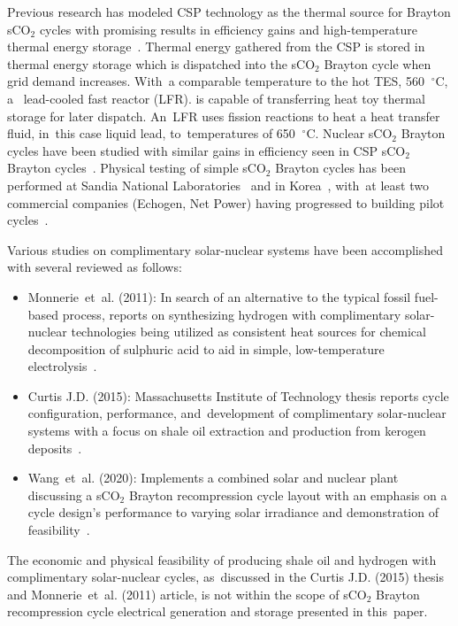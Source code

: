 \documentclass[sustainability,article,accept,moreauthors,pdftex]{Definitions/mdpi}
\begin{document}
 Previous research has modeled CSP technology as the thermal source for Brayton sCO$_2$ cycles with promising results in efficiency gains and high-temperature thermal energy storage~\cite{turchi_2013, iverson_2013, ho_2015, wang_2018, neises_2020}. Thermal energy gathered from the CSP is stored in thermal energy storage which is dispatched into the sCO$_2$ Brayton cycle when grid demand increases. With~a comparable temperature to the hot TES, 560 $~^{\circ}$C, a~%
{lead-cooled fast reactor (LFR).}
is capable of transferring heat toy thermal storage for later dispatch. An~LFR uses fission reactions to heat a heat transfer fluid, in~this case liquid lead, to~temperatures of 650 $~^{\circ}$C. Nuclear sCO$_2$ Brayton cycles have been studied with similar gains in efficiency seen in CSP sCO$_2$ Brayton cycles~\cite{dostal_2004, luo_2020}. Physical testing of simple sCO$_2$ Brayton cycles has been performed at Sandia National Laboratories~\cite{wright_2011} and in Korea~\cite{cha_2016}, with~at least two commercial companies (Echogen, Net Power) having progressed to building pilot cycles~\cite{held_2015,fetvedt_2016}. 

Various studies on complimentary solar-nuclear systems have been accomplished with several reviewed as follows: 

\begin{itemize}
    \item	Monnerie~et~al. (2011): In search of an alternative to the typical fossil fuel-based process, reports on synthesizing hydrogen with complimentary solar-nuclear technologies being utilized as consistent heat sources for chemical decomposition of sulphuric acid to aid in simple, low-temperature electrolysis~\cite{monnerie_2011}. 
    \item   Curtis J.D. (2015): Massachusetts Institute of Technology thesis reports cycle configuration, performance, and~development of complimentary solar-nuclear systems with a focus on shale oil extraction and production from kerogen deposits~\cite{curtis_2015}. 
    \item   Wang~et~al. (2020): Implements a combined solar and nuclear plant discussing a sCO$_2$ Brayton recompression cycle layout with an emphasis on a cycle design's performance to varying solar irradiance and demonstration of feasibility~\cite{wang_2020}. 
\end{itemize}

The economic and physical feasibility of producing shale oil and hydrogen with complimentary solar-nuclear cycles, as~discussed in the Curtis J.D. (2015) thesis and Monnerie~et~al. (2011) article, is not within the scope of sCO$_2$ Brayton recompression cycle electrical generation and storage presented in this~paper.
\end{document}
